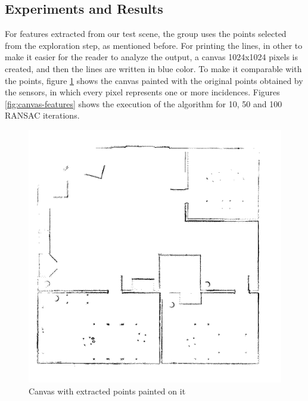 \documentclass[twoside,conference,a4paper]{IEEEtran}
\begin{document}
\subsection{Experiments and Results}

For features extracted from our test scene, the group uses the points selected from the exploration step, as mentioned before. For printing the lines, in other to make it easier for the reader to analyze the output, a canvas 1024x1024 pixels is created, and then the lines are written in blue color. To make it comparable with the points, figure \ref{fig:canvas-points} shows the canvas painted with the original points obtained by the sensors, in which every pixel represents one or more incidences. Figures \ref{fig:canvas-features} shows the execution of the algorithm for 10, 50 and 100 RANSAC iterations. 

\begin{figure}[H]
    \centering
    \includegraphics[scale=0.5,width=0.5\hsize]{figures/points.png}
    \caption{Canvas with extracted points painted on it}
    \label{fig:canvas-points}
\end{figure}
\end{document}
